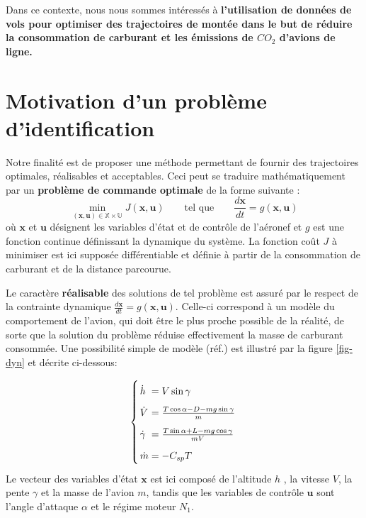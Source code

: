 \documentclass[a0,portrait]{a0poster}
\begin{document}
\begin{multicols}{2}
Dans ce contexte, nous nous sommes intéressés à \textbf{l'utilisation de données de vols pour optimiser des trajectoires de montée dans le but de réduire la consommation de carburant et les émissions de $CO_2$ d'avions de ligne.}


\color{DarkSlateGray} %
\section{Motivation d'un problème d'identification}

Notre finalité est de proposer une méthode permettant de fournir des trajectoires optimales, réalisables et acceptables. Ceci peut se traduire mathématiquement par un \textbf{problème de commande optimale} de la forme suivante :
\begin{equation}
\min_{(\bm{x,u}) \in \mathbb{X} \times \mathbb{U}} J(\bm{x,u}) 	\qquad     	 \textrm{tel que} \qquad \frac{d \bm{x} }{dt}=g(\bm{x,u})
\end{equation}
où $\bm{x}$ et $\bm{u}$ désignent les variables d'état et de contrôle de l'aéronef et $g$ est une fonction continue définissant la dynamique du système. La fonction coût $J$ à minimiser est ici supposée différentiable et définie à partir de la consommation de carburant et de la distance parcourue.


Le caractère \textbf{réalisable} des solutions de tel problème est assuré par le respect de la contrainte dynamique $\frac{d \bm{x} }{dt}=g(\bm{x,u})$. Celle-ci correspond à un modèle du comportement de l'avion, qui doit être le plus proche possible de la réalité, de sorte que la solution du problème réduise effectivement la masse de carburant consommée. Une possibilité simple de modèle (réf.\cite{hull}) est illustré par la figure \ref{fig-dyn} et décrite ci-dessous:

\begin{align} \label{eq-sys}
\arraycolsep=1.4pt\def\arraystretch{1.8}
\left\{ 
\begin{array}{ll}
\dot{h} &=  V \sin \gamma \\
\dot{V} &=  \frac{T \cos \alpha - D - mg \sin \gamma}{m}\\
\dot{\gamma} &= \frac{T \sin \alpha + L- mg \cos \gamma}{mV}\\
\dot{m} &= -C_{sp} T
\end{array} \right.
\end{align}
Le vecteur des variables d'état $\bm{x}$ est ici composé de l'altitude $h$ , la vitesse $V$, la pente $\gamma$ et la masse de l'avion $m$, tandis que les variables de contrôle $\bm{u}$ sont l'angle d'attaque $\alpha$ et le régime moteur $N_1$.
\newline


\end{multicols}
\end{document}

